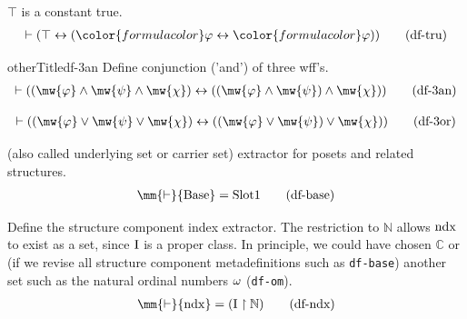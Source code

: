\begin{metadefinition} $\top$ is a
constant true.  
\begin{align}
\vdash ( \top \leftrightarrow ( {\color{formulacolor}\varphi} \leftrightarrow
    {\color{formulacolor}\varphi} ) )\label{df-tru}\tag{df-tru}
\end{align}
\end{metadefinition}


\begin{metadefinition}otherTitle{df-3an} {Define conjunction ('and') of three
wff's.}
\begin{align}
\vdash ( ( \mw{\varphi} \wedge \mw{\psi} \wedge \mw{\chi} ) \leftrightarrow ( (
    \mw{\varphi} \wedge \mw{\psi} ) \wedge \mw{\chi} )
    )\label{eq:df-3an}\tag{df-3an}
\end{align}
\end{metadefinition}


\begin{metadefinition}
\begin{align}
\vdash ( ( \mw{\varphi} \vee \mw{\psi} \vee \mw{\chi} ) \leftrightarrow ( (
    \mw{\varphi} \vee \mw{\psi} ) \vee \mw{\chi} )
    )\label{eq:df-3or}\tag{df-3or}
\end{align}
\end{metadefinition}


\begin{metadefinition} (also called
underlying set or carrier set) extractor
     for posets and related structures.  
\begin{align}
\mm{\vdash} {\rm Base} = {\rm Slot} 1\label{eq:df-base}\tag{df-base}
\end{align}
\end{metadefinition}


\begin{metadefinition} {Define the structure component index
extractor. } 
     The restriction to $\mathbb{N}$ allows ${\rm
ndx}$ to exist
     as a set, since ${\rm I}$ is a proper class.  In principle, we could have
     chosen $\mathbb{C}$ or (if we revise all structure component metadefinitions
such as
     {\tt df-base}) another set such as the natural ordinal numbers ${\rm
\omega}$
     ({\tt df-om}).  %
\begin{align}
\mm{\vdash} {\rm ndx} = ( {\rm I} \restriction \mathbb{N}
    )\label{eq:df-ndx}\tag{df-ndx}
\end{align}
\end{metadefinition}



